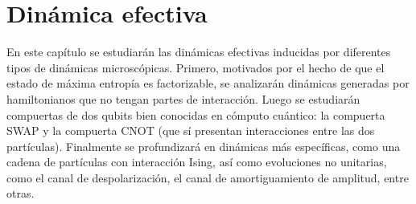 \chapter{Dinámica efectiva}\label{ch:4}


En este capítulo se estudiarán las dinámicas efectivas inducidas por diferentes tipos de dinámicas microscópicas. Primero, motivados por el hecho de que el estado de máxima entropía es factorizable, se analizarán dinámicas generadas por hamiltonianos que no tengan partes de interacción. Luego se estudiarán compuertas de dos qubits bien conocidas en cómputo cuántico: la compuerta SWAP y la compuerta CNOT (que sí presentan interacciones entre las dos partículas). Finalmente se profundizará en dinámicas más específicas, como una cadena de partículas con interacción Ising, así como evoluciones no unitarias, como el canal de despolarización, el canal de amortiguamiento de amplitud, entre otras.




\newpage